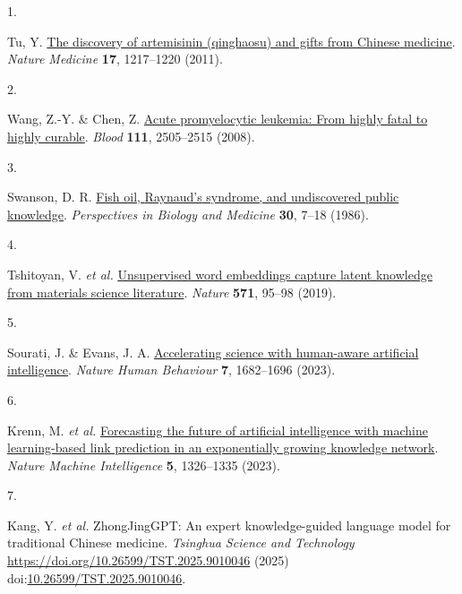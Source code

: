 \documentclass[
]{article}
\newlength{\cslhangindent}
\newlength{\csllabelwidth}
\newlength{\cslentryspacingunit} %
\newenvironment{CSLReferences}[2] %
 {%
  \setlength{\parindent}{0pt}
  \ifodd #1
  \let\oldpar\par
  \def\par{\hangindent=\cslhangindent\oldpar}
  \fi
  \setlength{\parskip}{#2\cslentryspacingunit}
 }%
 {}
\newcommand{\CSLLeftMargin}[1]{\parbox[t]{\csllabelwidth}{#1}}
\newcommand{\CSLRightInline}[1]{\parbox[t]{\linewidth - \csllabelwidth}{#1}\break}
\begin{document}
\hypertarget{refs}{}
\begin{CSLReferences}{0}{0}
\leavevmode{}%
\CSLLeftMargin{1. }%
\CSLRightInline{Tu, Y. \href{https://doi.org/10.1038/nm.2471}{The
discovery of artemisinin (qinghaosu) and gifts from {Chinese} medicine}.
\emph{Nature Medicine} \textbf{17}, 1217--1220 (2011).}

\leavevmode{}%
\CSLLeftMargin{2. }%
\CSLRightInline{Wang, Z.-Y. \& Chen, Z.
\href{https://doi.org/10.1182/blood-2007-07-102798}{Acute promyelocytic
leukemia: From highly fatal to highly curable}. \emph{Blood}
\textbf{111}, 2505--2515 (2008).}

\leavevmode{}%
\CSLLeftMargin{3. }%
\CSLRightInline{Swanson, D. R.
\href{https://doi.org/10.1353/pbm.1986.0087}{Fish oil, {Raynaud's}
syndrome, and undiscovered public knowledge}. \emph{Perspectives in
Biology and Medicine} \textbf{30}, 7--18 (1986).}

\leavevmode{}%
\CSLLeftMargin{4. }%
\CSLRightInline{Tshitoyan, V. \emph{et al.}
\href{https://doi.org/10.1038/s41586-019-1335-8}{Unsupervised word
embeddings capture latent knowledge from materials science literature}.
\emph{Nature} \textbf{571}, 95--98 (2019).}

\leavevmode{}%
\CSLLeftMargin{5. }%
\CSLRightInline{Sourati, J. \& Evans, J. A.
\href{https://doi.org/10.1038/s41562-023-01648-z}{Accelerating science
with human-aware artificial intelligence}. \emph{Nature Human Behaviour}
\textbf{7}, 1682--1696 (2023).}

\leavevmode{}%
\CSLLeftMargin{6. }%
\CSLRightInline{Krenn, M. \emph{et al.}
\href{https://doi.org/10.1038/s42256-023-00735-0}{Forecasting the future
of artificial intelligence with machine learning-based link prediction
in an exponentially growing knowledge network}. \emph{Nature Machine
Intelligence} \textbf{5}, 1326--1335 (2023).}

\leavevmode{}%
\CSLLeftMargin{7. }%
\CSLRightInline{Kang, Y. \emph{et al.} {ZhongJingGPT}: An expert
knowledge-guided language model for traditional {Chinese} medicine.
\emph{Tsinghua Science and Technology}
\url{https://doi.org/10.26599/TST.2025.9010046} (2025)
doi:\href{https://doi.org/10.26599/TST.2025.9010046}{10.26599/TST.2025.9010046}.}


\end{CSLReferences}
\end{document}
